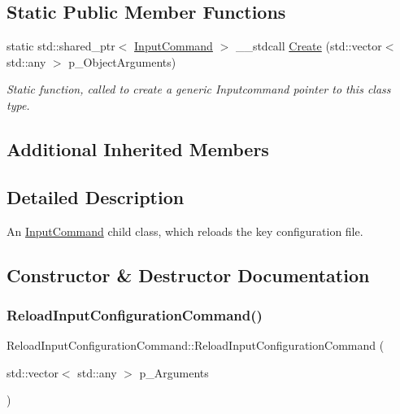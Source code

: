 \subsection*{Static Public Member Functions}
\begin{DoxyCompactItemize}
\item 
static std\+::shared\+\_\+ptr$<$ \mbox{\hyperlink{class_input_command}{Input\+Command}} $>$ \+\_\+\+\_\+stdcall \mbox{\hyperlink{class_reload_input_configuration_command_ac71aa5c8495377c01915dc05f420e8fa}{Create}} (std\+::vector$<$ std\+::any $>$ p\+\_\+\+Object\+Arguments)
\begin{DoxyCompactList}\small\item\em Static function, called to create a generic Inputcommand pointer to this class type. \end{DoxyCompactList}\end{DoxyCompactItemize}
\subsection*{Additional Inherited Members}


\subsection{Detailed Description}
An \mbox{\hyperlink{class_input_command}{Input\+Command}} child class, which reloads the key configuration file. 

\subsection{Constructor \& Destructor Documentation}
\mbox{\label{class_reload_input_configuration_command_ac1308f863b0a18e934fa246db5cc05d8}} 
\subsubsection{\texorpdfstring{ReloadInputConfigurationCommand()}{ReloadInputConfigurationCommand()}}
{\footnotesize\ttfamily Reload\+Input\+Configuration\+Command\+::\+Reload\+Input\+Configuration\+Command (\begin{DoxyParamCaption}\item[{std\+::vector$<$ std\+::any $>$}]{p\+\_\+\+Arguments }\end{DoxyParamCaption})\hspace{0.3cm}{\ttfamily [inline]}}



